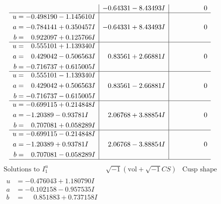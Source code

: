 \documentclass[1p]{elsarticle_modified}
\theoremstyle{definition}
\newcommand{\I}{\sqrt{-1}}
\begin{document}
$$\begin{array}{c|c|c}
 & -0.64331 - 8.43493 I & \phantom{-0.000000 } 0 \\ \hline\begin{aligned}
u &= -0.498190 - 1.145610 I \\
a &= -0.784141 + 0.350457 I \\
b &= \phantom{-}0.922097 + 0.125766 I\end{aligned}
 & -0.64331 + 8.43493 I & \phantom{-0.000000 } 0 \\ \hline\begin{aligned}
u &= \phantom{-}0.555101 + 1.139340 I \\
a &= \phantom{-}0.429042 - 0.506563 I \\
b &= -0.716737 + 0.615005 I\end{aligned}
 & \phantom{-}0.83561 + 2.66881 I & \phantom{-0.000000 } 0 \\ \hline\begin{aligned}
u &= \phantom{-}0.555101 - 1.139340 I \\
a &= \phantom{-}0.429042 + 0.506563 I \\
b &= -0.716737 - 0.615005 I\end{aligned}
 & \phantom{-}0.83561 - 2.66881 I & \phantom{-0.000000 } 0 \\ \hline\begin{aligned}
u &= -0.699115 + 0.214848 I \\
a &= -1.20389 - 0.93781 I \\
b &= \phantom{-}0.707081 + 0.058289 I\end{aligned}
 & \phantom{-}2.06768 + 3.88854 I & \phantom{-0.000000 } 0 \\ \hline\begin{aligned}
u &= -0.699115 - 0.214848 I \\
a &= -1.20389 + 0.93781 I \\
b &= \phantom{-}0.707081 - 0.058289 I\end{aligned}
 & \phantom{-}2.06768 - 3.88854 I & \phantom{-0.000000 } 0\\
 \hline 
 \end{array}$$\newpage$$\begin{array}{c|c|c}  
\text{Solutions to }I^u_{1}& \I (\text{vol} + \sqrt{-1}CS) & \text{Cusp shape}\\
 \hline 
\begin{aligned}
u &= -0.476043 + 1.180790 I \\
a &= -0.102158 - 0.957535 I \\
b &= \phantom{-}0.851883 + 0.737158 I\end{aligned}

\end{array}$$
\end{document}
